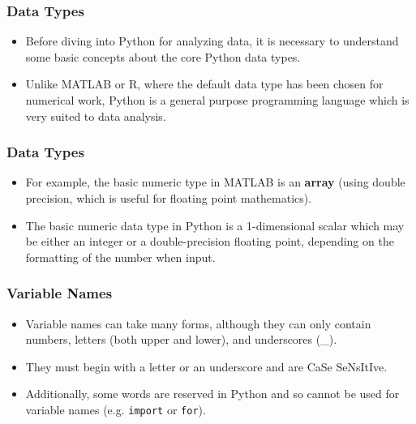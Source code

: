\documentclass[KSmainSlides.tex]{subfiles}
\begin{document}
 




\begin{frame}

\frametitle{Data Types}
\begin{itemize}
\item Before diving into Python for analyzing data, it is necessary to 
understand some basic concepts about the core Python data types.

\item Unlike MATLAB or R, where the default data type has been chosen for numerical work, Python is 
 a general purpose programming language which is very suited to data analysis.
\end{itemize}
\end{frame}
\begin{frame}
	
	\frametitle{Data Types}
	\begin{itemize}
\item For example,
the basic numeric type in MATLAB is an \textbf{array} (using double precision, which is useful for floating point
mathematics).
\item The basic numeric data type in Python is a 1-dimensional scalar which may be either
an integer or a double-precision floating point, depending on the formatting of the number when input.
\end{itemize}
\end{frame}
\begin{frame}
\frametitle{ Variable Names}
\begin{itemize}
\item Variable names can take many forms, although they can only contain numbers, letters (both upper and
lower), and underscores (\_). 

\item They must begin with a letter or an underscore and are CaSe SeNsItIve.
\item Additionally, some words are reserved in Python and so cannot be used for variable names (e.g. \texttt{import} or \texttt{for}).
\end{itemize}
\end{frame}
\end{document}
